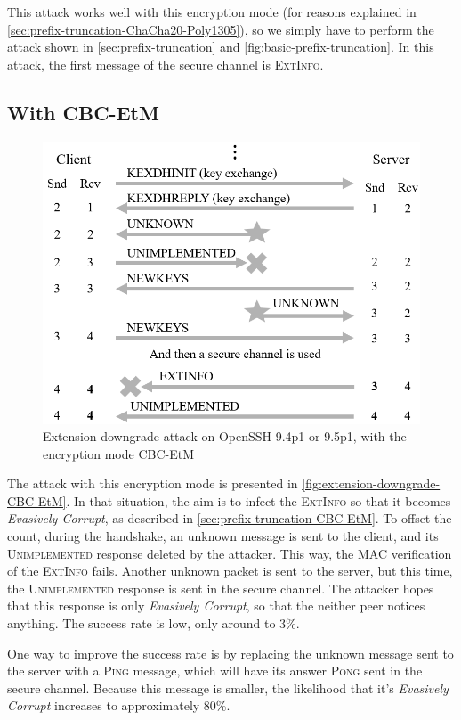 \documentclass[journal=tches,final]{iacrtrans}
\begin{document}
This attack works well with this encryption mode (for reasons explained in \autoref{sec:prefix-truncation-ChaCha20-Poly1305}), so we simply have to perform the attack shown in \autoref{sec:prefix-truncation} and \autoref{fig:basic-prefix-truncation}. In this attack, the first message of the secure channel is \textsc{ExtInfo}.

\subsection{With CBC-EtM}
\label{sec:downgrade-CBC-EtM}

\begin{figure}
    \centering
    \includegraphics[width=0.55\linewidth]{diagrams-i-made/Extension-downgrade-CBC-EtM.png}
    \caption{Extension downgrade attack on OpenSSH 9.4p1 or 9.5p1, with the encryption mode CBC-EtM}
    \label{fig:extension-downgrade-CBC-EtM}
\end{figure}

The attack with this encryption mode is presented in \autoref{fig:extension-downgrade-CBC-EtM}. In that situation, the aim is to infect the \textsc{ExtInfo} so that it becomes \textit{Evasively Corrupt}, as described in \autoref{sec:prefix-truncation-CBC-EtM}. To offset the count, during the handshake, an unknown message is sent to the client, and its \textsc{Unimplemented} response deleted by the attacker. This way, the MAC verification of the \textsc{ExtInfo} fails. Another unknown packet is sent to the server, but this time, the \textsc{Unimplemented} response is sent in the secure channel. The attacker hopes that this response is only \textit{Evasively Corrupt}, so that the neither peer notices anything. The success rate is low, only around to 3\%.

One way to improve the success rate is by replacing the unknown message sent to the server with a \textsc{Ping} message, which will have its answer \textsc{Pong} sent in the secure channel. Because this message is smaller, the likelihood that it's \textit{Evasively Corrupt} increases to approximately 80\%.
\end{document}
